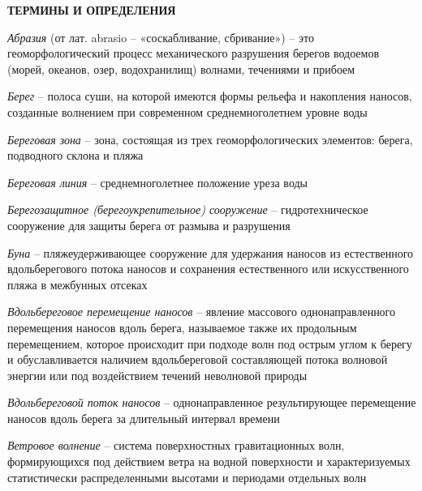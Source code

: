 \newpage
\begin{center}
  \textbf{ТЕРМИНЫ И ОПРЕДЕЛЕНИЯ}
\end{center}


\vspace{1em}
\noindent \textit{Абразия} (от лат. abrasio -- «соскабливание, сбривание») -- это геоморфологический процесс механического разрушения берегов водоемов (морей, океанов, озер, водохранилищ) волнами, течениями и прибоем

\noindent \textit{Берег} -- полоса суши, на которой имеются формы рельефа и накопления наносов, созданные волнением при современном среднемноголетнем уровне воды \cite{sp_277_1325800_2016}

\noindent \textit{Береговая зона} -- зона, состоящая из трех геоморфологических элементов: берега, подводного склона и пляжа  \cite{sp_277_1325800_2016}

\noindent \textit{Береговая линия} -- среднемноголетнее положение уреза воды \cite{sp_277_1325800_2016}

\noindent \textit{Берегозащитное (берегоукрепительное) сооружение} -- гидротехническое сооружение для защиты берега от размыва и разрушения \cite{gost_r_59241_2020, sp_277_1325800_2016}

\noindent \textit{Буна} -- пляжеудерживающее сооружение для удержания наносов из естественного вдольберегового потока наносов и сохранения естественного или искусственного пляжа в межбунных отсеках \cite{sp_32_103_97}

\noindent \textit{Вдольбереговое перемещение наносов} -- явление массового однонаправленного перемещения наносов вдоль берега, называемое также их продольным перемещением, которое происходит при подходе волн под острым углом к берегу и обуславливается наличием вдольбереговой составляющей потока волновой энергии или под воздействием течений неволновой природы \cite{sp_32_103_97}

\noindent \textit{Вдольбереговой поток наносов} -- однонаправленное результирующее перемещение наносов вдоль берега за длительный интервал времени \cite{sp_277_1325800_2016}

\noindent \textit{Ветровое волнение} -- система поверхностных гравитационных волн, формирующихся под действием ветра на водной поверхности и характеризуемых статистически распределенными высотами и периодами отдельных волн

